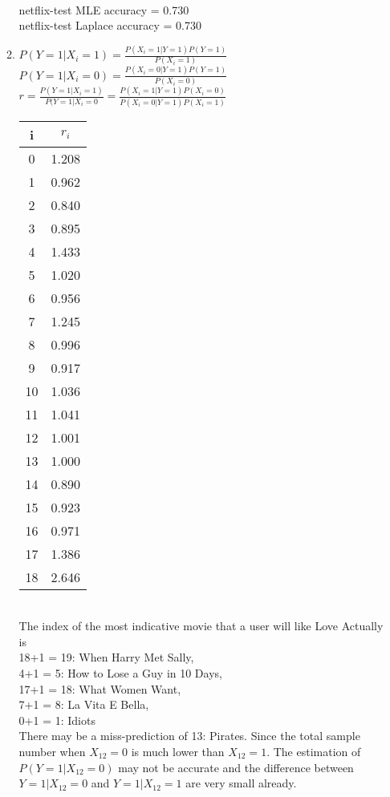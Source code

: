 \documentclass{article}
\begin{document}
\begin{enumerate}
\begin{enumerate}
\begin{tabular}{|c|c|c|c|c|}
		\end{tabular}\\
		netflix-test MLE accuracy = 0.730\\
		netflix-test Laplace accuracy = 0.730\\
		\item 
		$P(Y = 1|X_i = 1) = \frac{P(X_i = 1|Y = 1)P(Y = 1)}{P(X_i = 1)}$\\
		$P(Y = 1|X_i = 0) = \frac{P(X_i = 0|Y = 1)P(Y = 1)}{P(X_i = 0)}$\\
		$r = \frac{P(Y = 1|X_i = 1)}{P(Y = 1|X_i = 0} = \frac{P(X_i = 1|Y = 1)P(X_i = 0)}{P(X_i = 0|Y = 1)P(X_i = 1)}$\\
		\begin{tabular}{|c|c|}
			\hline
			i & $r_i$\\
			\hline
			0 & 1.208\\
			1 & 0.962\\
			2 & 0.840\\
			3 & 0.895\\
			4 & 1.433\\
			5 & 1.020\\
			6 & 0.956\\
			7 & 1.245\\
			8 & 0.996\\
			9 & 0.917\\
			10 & 1.036\\
			11 & 1.041\\
			12 & 1.001\\
			13 & 1.000\\
			14 & 0.890\\
			15 & 0.923\\
			16 & 0.971\\
			17 & 1.386\\
			18 & 2.646\\
			\hline
		\end{tabular}\\
		The index of the most indicative movie that a user will like Love Actually is\\
		18+1 = 19:  When Harry Met Sally,\\
		4+1 = 5: How to Lose a Guy in 10 Days, \\
		17+1 = 18: What Women Want, \\
		7+1 = 8: La Vita E Bella, \\
		0+1  = 1: Idiots\\
		
		There may be a miss-prediction of 13: Pirates. Since the total sample number when ${X_{12} = 0}$ is much lower than ${X_{12} = 1}$. The estimation of $P(Y = 1|X_{12} = 0)$ may not be accurate and the difference between ${Y = 1|X_{12} = 0}$ and ${Y = 1|X_{12} = 1}$ are very small already.\\
		

\end{enumerate}
\end{enumerate}
\end{document}

